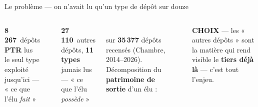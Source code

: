 \documentclass[11pt,aspectratio=169]{beamer}
\newcommand{\choixbox}[1]{%
  \colorbox{alertred!8}{\parbox{\dimexpr\linewidth-8pt}{\scriptsize
    \textbf{\textcolor{alertred}{CHOIX}}\; --- #1}}}
\begin{document}
\begin{frame}{Le problème --- on n'avait lu qu'un type de dépôt sur douze}
  \begin{columns}[T]
    \colorbox{helec!10}{\parbox[t]{\dimexpr\linewidth-8pt}{\vspace{0.8mm}
      {\Large\textbf{\color{helec}8\,267}}~dépôts \textbf{PTR} lus\\[0.4mm]
      {\scriptsize le seul type exploité jusqu'ici --- « ce que l'élu \emph{fait} »}}}\\[2.2mm]
    \colorbox{dataC!14}{\parbox[t]{\dimexpr\linewidth-8pt}{\vspace{0.8mm}
      {\Large\textbf{\color{dataC}27\,110}}~autres dépôts, \textbf{11 types}\\[0.4mm]
      {\scriptsize jamais lus --- « ce que l'élu \emph{possède} »}}}\\[2.2mm]
    {\footnotesize sur \textbf{35\,377} dépôts recensés (Chambre, 2014--2026).}
    {\footnotesize Décomposition du \textbf{patrimoine de sortie} d'un élu :}\\[2mm]
    \\[2.5mm]
    \choixbox{les « autres dépôts » sont la matière qui rend visible le \textbf{tiers déjà là} --- c'est tout l'enjeu.}
  \end{columns}
\end{frame}
\end{document}
